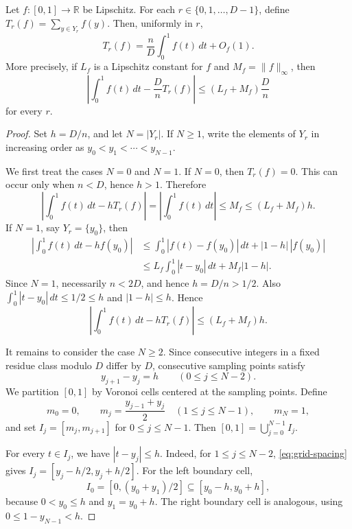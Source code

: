 \documentclass[10pt,a4paper]{amsart}
\newcommand{\R}{\mathbb{R}}
\begin{document}
\begin{lemma}\label{lem:Riemann}
Let \(f:[0,1]\to\R\) be Lipschitz.  For each
\(r\in\{0,1,\dots,D-1\}\), define \(T_r(f)=\sum_{y\in Y_r}f(y)\).  Then,
uniformly in \(r\),
\begin{equation}\label{eq:Riemann-main}
T_r(f)=\frac{n}{D}\int_0^1 f(t)\,dt+O_f(1).
\end{equation}
More precisely, if \(L_f\) is a Lipschitz constant for \(f\) and
\(M_f=\|f\|_\infty\), then
\begin{equation}\label{eq:Riemann-precise}
\left|\int_0^1 f(t)\,dt-\frac{D}{n}T_r(f)\right|
\le (L_f+M_f)\frac{D}{n}
\end{equation}
for every \(r\).
\end{lemma}

\begin{proof}
Set \(h=D/n\), and let \(N=|Y_r|\).  If \(N\ge1\), write the elements of
\(Y_r\) in increasing order as \(y_0<y_1<\cdots<y_{N-1}\).

We first treat the cases \(N=0\) and \(N=1\).  If \(N=0\), then
\(T_r(f)=0\).  This can occur only when \(n<D\), hence \(h>1\).  Therefore
\[
\left|\int_0^1 f(t)\,dt-hT_r(f)\right|
=
\left|\int_0^1 f(t)\,dt\right|
\le M_f
\le (L_f+M_f)h.
\]
If \(N=1\), say \(Y_r=\{y_0\}\), then
\[
\begin{aligned}
\left|\int_0^1 f(t)\,dt-hf(y_0)\right|
&\le
\int_0^1 |f(t)-f(y_0)|\,dt
+
|1-h|\,|f(y_0)|  \\
&\le
L_f\int_0^1 |t-y_0|\,dt
+
M_f|1-h|.
\end{aligned}
\]
Since \(N=1\), necessarily \(n<2D\), and hence \(h=D/n>1/2\).  Also
\(\int_0^1 |t-y_0|\,dt\le 1/2\le h\) and \(|1-h|\le h\).  Hence
\[
\left|\int_0^1 f(t)\,dt-hT_r(f)\right|
\le (L_f+M_f)h.
\]

It remains to consider the case \(N\ge2\).  Since consecutive integers in a
fixed residue class modulo \(D\) differ by \(D\), consecutive sampling points
satisfy
\begin{equation}\label{eq:grid-spacing}
y_{j+1}-y_j=h
\qquad (0\le j\le N-2).
\end{equation}
We partition \([0,1]\) by Voronoi cells centered at the sampling points.
Define
\[
m_0=0,
\qquad
m_j=\frac{y_{j-1}+y_j}{2}\quad (1\le j\le N-1),
\qquad
m_N=1,
\]
and set \(I_j=[m_j,m_{j+1}]\) for \(0\le j\le N-1\).  Then
\([0,1]=\bigcup_{j=0}^{N-1}I_j\).

For every \(t\in I_j\), we have \(|t-y_j|\le h\).  Indeed, for
\(1\le j\le N-2\), \eqref{eq:grid-spacing} gives
\(I_j=[y_j-h/2,y_j+h/2]\).  For the left boundary cell,
\[
I_0=[0,(y_0+y_1)/2]\subseteq [y_0-h,y_0+h],
\]
because \(0<y_0\le h\) and \(y_1=y_0+h\).  The right boundary cell is
analogous, using \(0\le 1-y_{N-1}<h\).


\end{proof}
\end{document}
